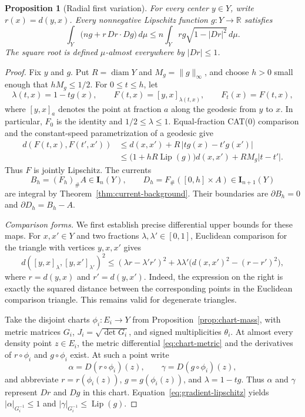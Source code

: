 \documentclass[11pt]{article}
\numberwithin{equation}{section}
\newtheorem{proposition}[theorem]{Proposition}
\theoremstyle{definition}
\theoremstyle{remark}
\newcommand{\R}{\mathbb R}
\newcommand{\I}{\mathbf I}
\newcommand{\dd}{\,d}
\newcommand{\Lip}{\operatorname{Lip}}
\DeclareMathOperator{\diam}{diam}
\begin{document}
\begin{proposition}[Radial first variation]
\label{prop:radial}
For every center $y\in Y$, write $r(x)=d(y,x)$.  Every nonnegative
Lipschitz function $g:Y\to\R$ satisfies
\begin{equation}
 \int_Y \bigl(ng+r\,Dr\cdot Dg\bigr)\dd\mu
 \leq n\int_Y rg\sqrt{1-|Dr|^2}\dd\mu.
 \label{eq:radial}
\end{equation}
The square root is defined $\mu$-almost everywhere by
$|Dr|\leq 1$.
\end{proposition}

\begin{proof}
Fix $y$ and $g$.  Put $R=\diam Y$ and $M_g=\|g\|_\infty$, and choose
$h>0$ small enough that $hM_g\leq 1/2$.  For $0\leq t\leq h$, let
\[
 \lambda(t,x)=1-tg(x),\qquad
 F(t,x)=[y,x]_{\lambda(t,x)},\qquad F_t(x)=F(t,x),
\]
where $[y,x]_a$ denotes the point at fraction $a$ along the geodesic
from $y$ to $x$.  In particular, $F_0$ is the identity and
$1/2\leq\lambda\leq1$.  Equal-fraction CAT(0) comparison and the
constant-speed parametrization of a geodesic give
\begin{align*}
 d(F(t,x),F(t',x'))
 &\leq d(x,x')+R\,|tg(x)-t'g(x')|\\
 &\leq \bigl(1+hR\Lip(g)\bigr)d(x,x')
       +RM_g|t-t'|.
\end{align*}
Thus $F$ is jointly Lipschitz.  The currents
\[
 B_h=(F_h)_\#A\in\I_n(Y),\qquad
 D_h=F_\#([0,h]\times A)\in\I_{n+1}(Y)
\]
are integral by Theorem~\ref{thm:current-background}.  Their boundaries
are $\partial B_h=0$ and $\partial D_h=B_h-A$.

\emph{Comparison forms.}
We first establish precise differential upper bounds for these maps.
For $x,x'\in Y$ and two fractions $\lambda,\lambda'\in[0,1]$, Euclidean
comparison for the triangle with vertices $y,x,x'$ gives
\begin{equation}
 d([y,x]_\lambda,[y,x']_{\lambda'})^2
 \leq (\lambda r-\lambda'r')^2
       +\lambda\lambda'\bigl(d(x,x')^2-(r-r')^2\bigr),
 \label{eq:radial-two-point}
\end{equation}
where $r=d(y,x)$ and $r'=d(y,x')$.  Indeed, the expression on the
right is exactly the squared distance between the corresponding
points in the Euclidean comparison triangle.  This remains valid for
degenerate triangles.

Take the disjoint charts $\phi_i:E_i\to Y$ from
Proposition~\ref{prop:chart-mass}, with metric matrices $G_i$,
$J_i=\sqrt{\det G_i}$, and signed multiplicities $\theta_i$.
At almost every density point $z\in E_i$, the metric differential
\eqref{eq:chart-metric} and the derivatives of $r\circ\phi_i$ and
$g\circ\phi_i$ exist.  At such a point write
\[
 \alpha=D(r\circ\phi_i)(z),\qquad
 \gamma=D(g\circ\phi_i)(z),
\]
and abbreviate $r=r(\phi_i(z))$, $g=g(\phi_i(z))$, and
$\lambda=1-tg$.  Thus $\alpha$ and $\gamma$ represent $Dr$ and $Dg$
in this chart.  Equation~\eqref{eq:gradient-lipschitz} yields
$|\alpha|_{G_i^{-1}}\leq1$ and
$|\gamma|_{G_i^{-1}}\leq\Lip(g)$.


\end{proof}
\end{document}
